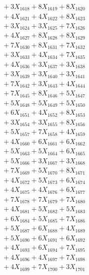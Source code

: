 \documentclass[a4paper,10pt]{article}
\begin{document}
{\begin{align}
&\;  + 3 X_{1618} + 8 X_{1619} + 8 X_{1620} \\[0.3ex]
&\;  + 4 X_{1621} + 4 X_{1622} + 8 X_{1623} \\[0.3ex]
&\;  + 3 X_{1624} + 3 X_{1625} + 7 X_{1626} \\[0.3ex]
&\;  + 4 X_{1627} + 8 X_{1628} + 8 X_{1629} \\[0.5ex]\allowbreak
&\;  + 7 X_{1630} + 8 X_{1631} + 7 X_{1632} \\[0.3ex]
&\;  + 3 X_{1633} + 4 X_{1634} + 7 X_{1635} \\[0.3ex]
&\;  + 4 X_{1636} + 3 X_{1637} + 3 X_{1638} \\[0.3ex]
&\;  + 3 X_{1639} + 3 X_{1640} + 3 X_{1641} \\[0.3ex]
&\;  + 7 X_{1642} + 3 X_{1643} + 4 X_{1644} \\[0.3ex]
&\;  + 7 X_{1645} + 8 X_{1646} + 5 X_{1647} \\[0.3ex]
&\;  + 5 X_{1648} + 5 X_{1649} + 5 X_{1650} \\[0.3ex]
&\;  + 6 X_{1651} + 4 X_{1652} + 8 X_{1653} \\[0.3ex]
&\;  + 3 X_{1654} + 3 X_{1655} + 8 X_{1656} \\[0.3ex]
&\;  + 5 X_{1657} + 7 X_{1658} + 4 X_{1659} \\[0.5ex]\allowbreak
&\;  + 4 X_{1660} + 6 X_{1661} + 6 X_{1662} \\[0.3ex]
&\;  + 5 X_{1663} + 5 X_{1664} + 6 X_{1665} \\[0.3ex]
&\;  + 5 X_{1666} + 3 X_{1667} + 3 X_{1668} \\[0.3ex]
&\;  + 7 X_{1669} + 5 X_{1670} + 8 X_{1671} \\[0.3ex]
&\;  + 4 X_{1672} + 5 X_{1673} + 6 X_{1674} \\[0.3ex]
&\;  + 4 X_{1675} + 4 X_{1676} + 6 X_{1677} \\[0.3ex]
&\;  + 7 X_{1678} + 7 X_{1679} + 7 X_{1680} \\[0.3ex]
&\;  + 4 X_{1681} + 5 X_{1682} + 5 X_{1683} \\[0.3ex]
&\;  + 6 X_{1684} + 5 X_{1685} + 7 X_{1686} \\[0.3ex]
&\;  + 5 X_{1687} + 6 X_{1688} + 4 X_{1689} \\[0.5ex]\allowbreak
&\;  + 5 X_{1690} + 6 X_{1691} + 6 X_{1692} \\[0.3ex]
&\;  + 4 X_{1693} + 6 X_{1694} + 7 X_{1695} \\[0.3ex]
&\;  + 4 X_{1696} + 4 X_{1697} + 7 X_{1698} \\[0.3ex]
&\;  + 4 X_{1699} + 7 X_{1700} + 3 X_{1701} \\[0.3ex]

\end{align}}
\end{document}
